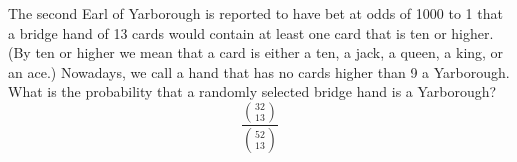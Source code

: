 \item The second Earl of Yarborough is reported to have bet at odds of 1000 to 1 that a bridge hand of 13 cards would contain at least one card that is ten or higher. (By ten or higher we mean that a card is either a ten, a jack, a queen, a king, or an ace.) Nowadays, we call a hand that has no cards higher than 9 a Yarborough. What is the probability that a randomly selected bridge hand is a Yarborough?
\[ \frac{\binom{32}{13}}{\binom{52}{13}} \]